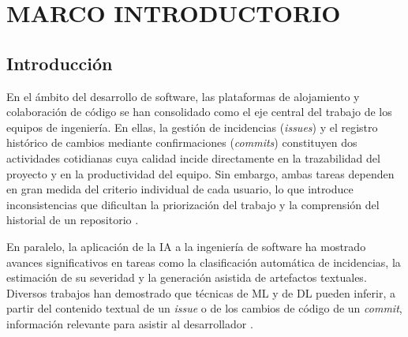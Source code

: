 \newpage
%
%
%


\section{MARCO INTRODUCTORIO}
\subsection{Introducción}

En el ámbito del desarrollo de software, las plataformas de alojamiento y colaboración de código se han consolidado como el eje central del trabajo de los equipos de ingeniería. En ellas, la gestión de incidencias (\textit{issues}) y el registro histórico de cambios mediante confirmaciones (\textit{commits}) constituyen dos actividades cotidianas cuya calidad incide directamente en la trazabilidad del proyecto y en la productividad del equipo. Sin embargo, ambas tareas dependen en gran medida del criterio individual de cada usuario, lo que introduce inconsistencias que dificultan la priorización del trabajo y la comprensión del historial de un repositorio \citep{Kallis2019}.

En paralelo, la aplicación de la \acrfull{IA} a la ingeniería de software ha mostrado avances significativos en tareas como la clasificación automática de incidencias, la estimación de su severidad y la generación asistida de artefactos textuales. Diversos trabajos han demostrado que técnicas de \acrfull{ML} y de \acrfull{DL} pueden inferir, a partir del contenido textual de un \textit{issue} o de los cambios de código de un \textit{commit}, información relevante para asistir al desarrollador \citep{Lamkanfi2010, Jiang2017}.

